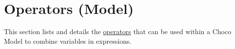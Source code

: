 \chapter{Operators (Model)}\label{ch:operators}\hypertarget{ch:operators}{}
This section lists and details the \hyperlink{model:expressionvariables}{operators} that can be used within a Choco Model to combine variables in expressions.















%
